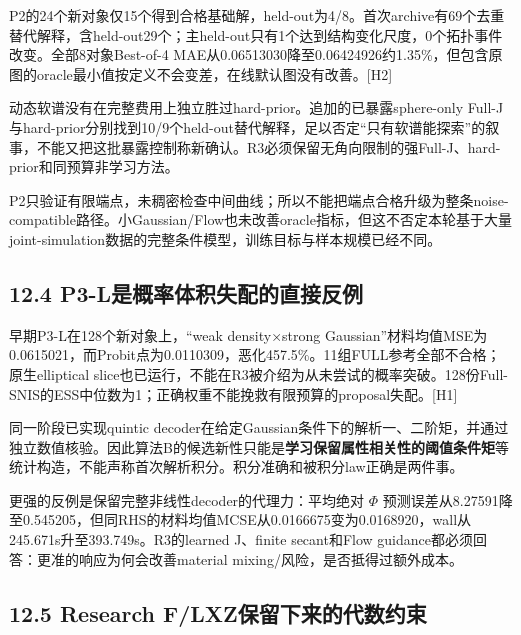 \documentclass[
  11pt,
  a4paper,
]{article}
\begin{document}
P2的24个新对象仅15个得到合格基础解，held-out为4/8。首次archive有69个去重替代解释，含held-out29个；主held-out只有1个达到结构变化尺度，0个拓扑事件改变。全部8对象Best-of-4
MAE从0.06513030降至0.06424926约1.35\%，但包含原图的oracle最小值按定义不会变差，在线默认图没有改善。{[}H2{]}

动态软谱没有在完整费用上独立胜过hard-prior。追加的已暴露sphere-only
Full-J与hard-prior分别找到10/9个held-out替代解释，足以否定``只有软谱能探索''的叙事，不能又把这批暴露控制称新确认。R3必须保留无角向限制的强Full-J、hard-prior和同预算非学习方法。

P2只验证有限端点，未稠密检查中间曲线；所以不能把端点合格升级为整条noise-compatible路径。小Gaussian/Flow也未改善oracle指标，但这不否定本轮基于大量joint-simulation数据的完整条件模型，训练目标与样本规模已经不同。

\hypertarget{p3-lux662fux6982ux7387ux4f53ux79efux5931ux914dux7684ux76f4ux63a5ux53cdux4f8b}{%
\subsection{12.4
P3-L是概率体积失配的直接反例}\label{p3-lux662fux6982ux7387ux4f53ux79efux5931ux914dux7684ux76f4ux63a5ux53cdux4f8b}}

早期P3-L在128个新对象上，``weak density×strong
Gaussian''材料均值MSE为0.0615021，而Probit点为0.0110309，恶化457.5\%。11组FULL参考全部不合格；原生elliptical
slice也已运行，不能在R3被介绍为从未尝试的概率突破。128份Full-SNIS的ESS中位数为1；正确权重不能挽救有限预算的proposal失配。{[}H1{]}

同一阶段已实现quintic
decoder在给定Gaussian条件下的解析一、二阶矩，并通过独立数值核验。因此算法B的候选新性只能是\textbf{学习保留属性相关性的阈值条件矩}等统计构造，不能声称首次解析积分。积分准确和被积分law正确是两件事。

更强的反例是保留完整非线性decoder的代理力：平均绝对 \(\Phi\)
预测误差从8.27591降至0.545205，但同RHS的材料均值MCSE从0.0166675变为0.0168920，wall从245.671s升至393.749s。R3的learned
J、finite secant和Flow guidance都必须回答：更准的响应为何会改善material
mixing/风险，是否抵得过额外成本。

\hypertarget{research-flxzux4fddux7559ux4e0bux6765ux7684ux4ee3ux6570ux7ea6ux675f}{%
\subsection{12.5 Research
F/LXZ保留下来的代数约束}\label{research-flxzux4fddux7559ux4e0bux6765ux7684ux4ee3ux6570ux7ea6ux675f}}
\end{document}
